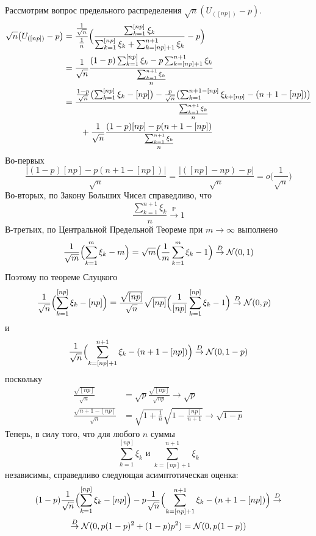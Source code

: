 \documentclass[a4paper]{article}
\newcommand{\Ncal}{\mathcal{N}}
\newcommand{\pr}[0]{{\mathbb{P}}}
\begin{document}
Рассмотрим вопрос предельного распределения $\sqrt{n}(U_{([np])} - p)$.
\begin{align*}
	\sqrt{n} \bigl( U_{([np])} - p \bigr)
	&= \frac{\frac{1}{\sqrt{n}}}{\frac{1}{n}}\Bigl(
		\frac{\sum_{k=1}^{[np]} \xi_k}{\sum_{k=1}^{[np]} \xi_k + \sum_{k=[np]+1}^{n+1} \xi_k} - p \Bigr)\\
	&= \frac{1}{\sqrt{n}}\frac{(1-p)\sum_{k=1}^{[np]} \xi_k - p \sum_{k=[np]+1}^{n+1} \xi_k}{\frac{\sum_{k=1}^{n+1} \xi_k}{n}}\\
	&= \frac{\frac{1-p}{\sqrt{n}}\bigl(\sum_{k=1}^{[np]} \xi_k - [np]\bigr)
			- \frac{p}{\sqrt{n}}\bigl(\sum_{k=1}^{n+1-[np]} \xi_{k+[np]} - (n+1-[np])\bigr)}{\frac{\sum_{k=1}^{n+1} \xi_k}{n}}\\
	&\quad \quad + \frac{1}{\sqrt{n}}\frac{(1-p)[np] - p(n+1-[np])}{\frac{\sum_{k=1}^{n+1} \xi_k}{n}}
\end{align*}
Во-первых
\[
\frac{\lvert(1-p)[np] - p(n+1-[np])\rvert}{\sqrt{n}}
= \frac{\lvert ([np] - np) - p\rvert}{\sqrt{n}}
= o\bigl(\frac{1}{\sqrt{n}}\bigr)
\]
Во-вторых, по Закону Больших Чисел справедливо, что
\[\frac{\sum_{k=1}^{n+1} \xi_k}{n} \overset{\pr}{\to} 1\]
В-третьих, по Центральной Предельной Теореме при $m\to \infty$ выполнено
\[
\frac{1}{\sqrt{m}}\Bigl(\sum_{k=1}^m \xi_k - m\Bigr)
= \sqrt{m}\Bigl(\frac{1}{m}\sum_{k=1}^m \xi_k - 1\Bigr)
\overset{D}{\to} \Ncal(0,1)
\]
Поэтому по теореме Слуцкого
\begin{align*}
	\frac{1}{\sqrt{n}}\Bigl(\sum_{k=1}^{[np]} \xi_k - [np]\Bigr)
	&= \frac{\sqrt{[np]}}{\sqrt{n}}
		\sqrt{[np]}\Bigl(\frac{1}{[np]}\sum_{k=1}^{[np]} \xi_k - 1\Bigr)
		\overset{D}{\to} \Ncal(0,p)
\end{align*}
и
\[\frac{1}{\sqrt{n}}\Bigl(\sum_{k=[np]+1}^{n+1} \xi_k - (n+1-[np])\Bigr) \overset{D}{\to} \Ncal(0,1-p)\]
поскольку
\begin{align*}
	\frac{\sqrt{[np]}}{\sqrt{n}}
	&= \sqrt{p} \frac{\sqrt{[np]}}{\sqrt{np}}
		\to \sqrt{p}\\
	\frac{\sqrt{n+1-[np]}}{\sqrt{n}}
	&= \sqrt{1+\frac{1}{n}} \sqrt{1-\frac{[np]}{n+1}}
		\to \sqrt{1-p}
\end{align*}
Теперь, в силу того, что для любого $n$ суммы
\[\sum_{k=1}^{[np]} \xi_k\text{ и }\sum_{k=[np]+1}^{n+1} \xi_k\]
независимы, справедливо следующая асимптотическая оценка:
\begin{multline*}
(1-p)\frac{1}{\sqrt{n}}\Bigl(\sum_{k=1}^{[np]} \xi_k - [np]\Bigr)
- p\frac{1}{\sqrt{n}}\Bigl(\sum_{k=[np]+1}^{n+1} \xi_k - (n+1-[np])\Bigr) \overset{D}{\to} \\
\overset{D}{\to} \Ncal(0, p(1-p)^2 + (1-p)p^2)
= \Ncal(0, p(1-p))
\end{multline*}
\end{document}
